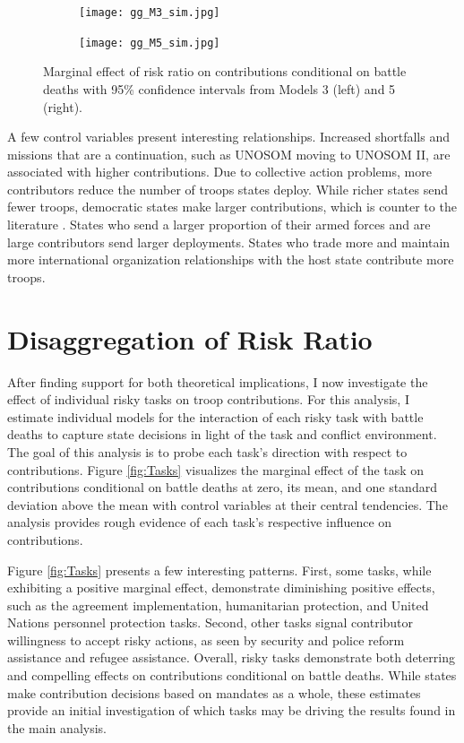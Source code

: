 \documentclass[12pt]{article}
\begin{document}
\begin{figure}[t!]
\begin{subfigure}[h]{0.5\linewidth}
\texttt{[image: gg\_M3\_sim.jpg]}
\end{subfigure}
\hfill
\begin{subfigure}[h]{0.5\linewidth}
\texttt{[image: gg\_M5\_sim.jpg]}
\end{subfigure}
\vspace{-3mm}
\caption{\small Marginal effect of risk ratio on contributions conditional on battle deaths with 95\% confidence intervals from Models 3 (left) and 5 (right).}
\label{fig:RR_X_bd}
\end{figure}

A few control variables present interesting relationships. Increased shortfalls and missions that are a continuation, such as UNOSOM moving to UNOSOM II, are associated with higher contributions. Due to collective action problems, more contributors reduce the number of troops states deploy. While richer states send fewer troops, democratic states make larger contributions, which is counter to the literature \citep[Ex.][]{duursma2019}. States who send a larger proportion of their armed forces and are large contributors send larger deployments. States who trade more and maintain more international organization relationships with the host state contribute more troops.

\section*{Disaggregation of Risk Ratio}

After finding support for both theoretical implications, I now investigate the effect of individual risky tasks on troop contributions. For this analysis, I estimate individual models for the interaction of each risky task with battle deaths to capture state decisions in light of the task and conflict environment. The goal of this analysis is to probe each task's direction with respect to contributions. Figure \ref{fig:Tasks} visualizes the marginal effect of the task on contributions conditional on battle deaths at zero, its mean, and one standard deviation above the mean with control variables at their central tendencies. The analysis provides rough evidence of each task's respective influence on contributions. 

Figure \ref{fig:Tasks} presents a few interesting patterns. First, some tasks, while exhibiting a positive marginal effect, demonstrate diminishing positive effects, such as the agreement implementation, humanitarian protection, and United Nations personnel protection tasks. Second, other tasks signal contributor willingness to accept risky actions, as seen by security and police reform assistance and refugee assistance. Overall, risky tasks demonstrate both deterring and compelling effects on contributions conditional on battle deaths. While states make contribution decisions based on mandates as a whole, these estimates provide an initial investigation of which tasks may be driving the results found in the main analysis. 
\end{document}

